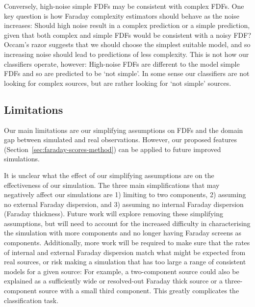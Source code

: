     Conversely, high-noise simple FDFs may be consistent with complex FDFs. One key question is how Faraday complexity estimators should behave as the noise increases: Should high noise result in a complex prediction or a simple prediction, given that both complex and simple FDFs would be consistent with a noisy FDF? Occam's razor suggests that we should choose the simplest suitable model, and so increasing noise should lead to predictions of less complexity. This is not how our classifiers operate, however: High-noise FDFs are different to the model simple FDFs and so are predicted to be `not simple'. In some sense our classifiers are not looking for complex sources, but are rather looking for `not simple' sources.

  \subsection{Limitations}
  \label{sec:faraday-limitations}

    Our main limitations are our simplifying assumptions on FDFs and the domain gap between simulated and real observations. However, our proposed features (Section~\autoref{sec:faraday-scores-method}) can be applied to future improved simulations.

    It is unclear what the effect of our simplifying assumptions are on the effectiveness of our simulation. The three main simplifications that may negatively affect our simulations are 1) limiting to two components, 2) assuming no external Faraday dispersion, and 3) assuming no internal Faraday dispersion (Faraday thickness). Future work will explore removing these simplifying assumptions, but will need to account for the increased difficulty in characterising the simulation with more components and no longer having Faraday screens as components. Additionally, more work will be required to make sure that the rates of internal and external Faraday dispersion match what might be expected from real sources, or risk making a simulation that has too large a range of consistent models for a given source: For example, a two-component source could also be explained as a sufficiently wide or resolved-out Faraday thick source or a three-component source with a small third component. This greatly complicates the classification task.

